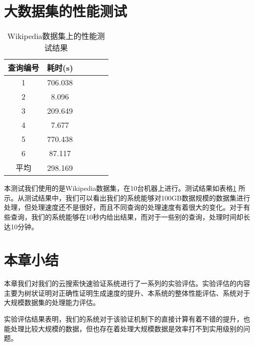\section {大数据集的性能测试}
\begin{table}[htb]
    \centering
    \caption{Wikipedia数据集上的性能测试结果}
    \begin{tabular}{cccccc}
        \toprule
        查询编号 & 耗时(s) \\
        \midrule
        1 & 706.038  \\
        2 & 8.096  \\
        3 & 209.649  \\
        4 & 7.677  \\
        5 & 770.438  \\
        6 & 87.117  \\
        \midrule
        平均 & 298.169  \\
        \bottomrule
    \end{tabular}
    \label{tab:wiki_speedup}
\end{table}
本测试我们使用的是Wikipedia数据集，在10台机器上进行。测试结果如表格\ref{tab:wiki_speedup} 所示。从测试结果中，我们可以看出我们的系统能够对100GB数据规模的数据集进行处理，但处理速度还不是很好，而且不同查询的处理速度有着很大的变化。对于有些查询，我们的系统能够在10秒内给出结果，而对于一些别的查询，处理时间却长达10分钟。

\section{本章小结}
本章我们对我们的云搜索快速验证系统进行了一系列的实验评估。实验评估的内容主要为树状证明对正确性证明生成速度的提升、本系统的整体性能评估、系统对于大规模数据集的处理能力评估。

实验评估结果表明，我们的系统对于该验证机制下的直接计算有着不错的提升，也能处理比较大规模的数据，但也存在着处理大规模数据是效率打不到实用级别的问题。
